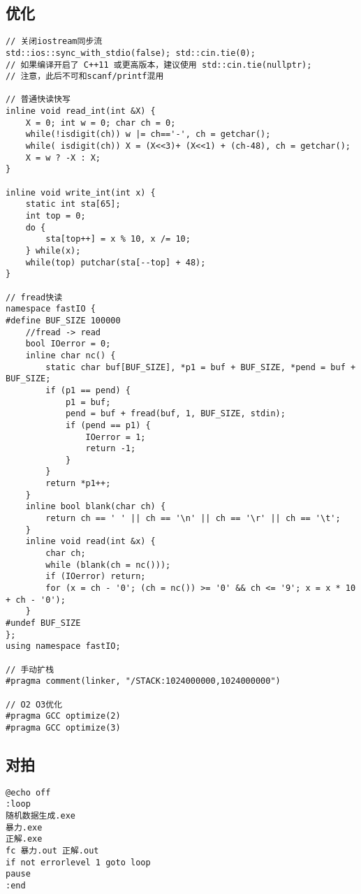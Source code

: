 \subsection{优化}
\begin{lstlisting}
// 关闭iostream同步流
std::ios::sync_with_stdio(false); std::cin.tie(0);
// 如果编译开启了 C++11 或更高版本，建议使用 std::cin.tie(nullptr);
// 注意，此后不可和scanf/printf混用

// 普通快读快写
inline void read_int(int &X) {
    X = 0; int w = 0; char ch = 0;
    while(!isdigit(ch)) w |= ch=='-', ch = getchar();
    while( isdigit(ch)) X = (X<<3)+ (X<<1) + (ch-48), ch = getchar();
    X = w ? -X : X;
}

inline void write_int(int x) {
    static int sta[65];
    int top = 0;
    do {
        sta[top++] = x % 10, x /= 10;
    } while(x);
    while(top) putchar(sta[--top] + 48); 
}

// fread快读
namespace fastIO {
#define BUF_SIZE 100000
    //fread -> read
    bool IOerror = 0;
    inline char nc() {
        static char buf[BUF_SIZE], *p1 = buf + BUF_SIZE, *pend = buf + BUF_SIZE;
        if (p1 == pend) {
            p1 = buf;
            pend = buf + fread(buf, 1, BUF_SIZE, stdin);
            if (pend == p1) {
                IOerror = 1;
                return -1;
            }
        }
        return *p1++;
    }
    inline bool blank(char ch) {
        return ch == ' ' || ch == '\n' || ch == '\r' || ch == '\t';
    }
    inline void read(int &x) {
        char ch;
        while (blank(ch = nc()));
        if (IOerror) return;
        for (x = ch - '0'; (ch = nc()) >= '0' && ch <= '9'; x = x * 10 + ch - '0');
    }
#undef BUF_SIZE
};
using namespace fastIO;

// 手动扩栈
#pragma comment(linker, "/STACK:1024000000,1024000000") 

// O2 O3优化
#pragma GCC optimize(2)
#pragma GCC optimize(3)
\end{lstlisting}

\subsection{对拍}
\begin{lstlisting}
@echo off
:loop
随机数据生成.exe
暴力.exe
正解.exe
fc 暴力.out 正解.out
if not errorlevel 1 goto loop
pause
:end
\end{lstlisting}

